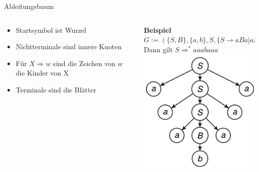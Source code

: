 \documentclass[handout]{beamer}
\begin{document}
\begin{frame}{Ableitungsbaum}
	\begin{columns}
		\begin{column}{0.5\textwidth}
			\begin{itemize}
				\item Startsymbol ist Wurzel
				\item Nichtterminale sind innere Knoten
				\item Für $X \Rightarrow w $ sind die Zeichen von $w$ die Kinder von X
				\item Terminale sind die Blätter
			\end{itemize}
		\end{column}
		
		\begin{column}{0.5\textwidth}\bp
			\textbf{Beispiel}\\
			$G:= (\{S,B\}, \{a,b\}, S, \{S \rightarrow aBa|aSa, B \rightarrow b\})$\bp\\
			Dann gilt $S \Rightarrow^* aaabaaa$\\
			\center \includegraphics[scale=0.7]{images/Ableitungsbaum.png}
		\end{column}
	\end{columns}
	
\end{frame}
\end{document}
